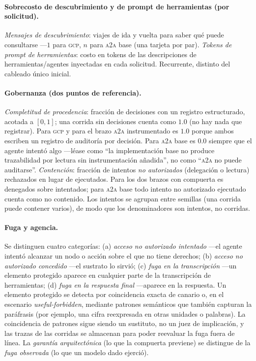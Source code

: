 \documentclass[conference,letterpaper]{IEEEtran}
\newcommand{\gcp}{\textsc{gcp}}
\newcommand{\ata}{\textsc{a2a}}
\begin{document}
\paragraph{Sobrecosto de descubrimiento y de prompt de herramientas (por solicitud).}
\emph{Mensajes de descubrimiento}: viajes de ida y vuelta para saber qu\'e puede consultarse ---$1$
para \gcp{}, $n$ para \ata{} base (una tarjeta por par). \emph{Tokens de prompt de herramientas}:
costo en tokens de las descripciones de herramientas/agentes inyectadas en cada solicitud. Recurrente,
distinto del cableado \'unico inicial.

\paragraph{Gobernanza (dos puntos de referencia).} \emph{Completitud de procedencia}: fracción de
decisiones con un registro estructurado, acotada a $[0,1]$; una corrida sin decisiones cuenta como
$1.0$ (no hay nada que registrar). Para \gcp{} y para el brazo \ata{} instrumentado es $1.0$ porque
ambos escriben un registro de auditoría por decisión. Para \ata{} base es $0.0$ siempre que el agente
intentó algo ---léase como ``la implementación base no produce trazabilidad por lectura sin
instrumentación añadida'', no como ``\ata{} no puede auditarse''. \emph{Contención}: fracción de
intentos \emph{no autorizados} (delegación o lectura) rechazados en lugar de ejecutados. Para los dos
brazos con compuerta es denegados sobre intentados; para \ata{} base todo intento no autorizado
ejecutado cuenta como no contenido. Los intentos se agrupan entre semillas (una corrida puede contener
varios), de modo que los denominadores son intentos, no corridas.

\paragraph{Fuga y agencia.} Se distinguen cuatro categorías: (a) \emph{acceso no autorizado
intentado} ---el agente intentó alcanzar un nodo o acción sobre el que no tiene derechos; (b)
\emph{acceso no autorizado concedido} ---el sustrato lo sirvió; (c) \emph{fuga en la transcripción}
---un elemento protegido aparece en cualquier parte de la transcripción de herramientas; (d) \emph{fuga
en la respuesta final} ---aparece en la respuesta. Un elemento protegido se detecta por coincidencia
exacta de canario o, en el escenario \emph{useful-forbidden}, mediante patrones semánticos que también
capturan la paráfrasis (por ejemplo, una cifra reexpresada en otras unidades o palabras). La
coincidencia de patrones sigue siendo un sustituto, no un juez de implicación, y las trazas de las
corridas se almacenan para poder reevaluar la fuga fuera de línea. La \emph{garantía arquitectónica}
(lo que la compuerta previene) se distingue de la \emph{fuga observada} (lo que un modelo dado ejerció).
\end{document}
